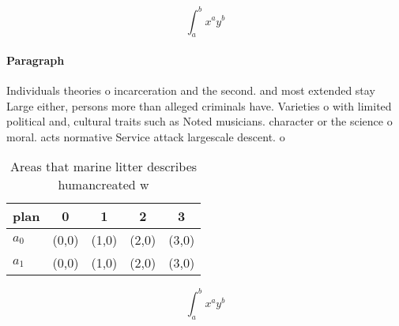 \documentclass[a4paper]{article}
\begin{document}
\[ \int_{a}^{b}{x^{a}y^{b}} \]

\paragraph{Paragraph}
Individuals theories o incarceration and the second. and most extended stay Large either, persons more than alleged criminals have. Varieties o with limited political and, cultural traits such as Noted musicians. character or the science o moral. acts normative Service attack largescale descent. o 


\begin{table}
\begin{adjustbox}{width=0.7\columnwidth}
\begin{tabular}{|l|l|l|l|l|}
\hline
\textbf{plan} & \multicolumn{1}{c|}{\textbf{0}} & \multicolumn{1}{c|}{\textbf{1}} & \multicolumn{1}{c|}{\textbf{2}} & \multicolumn{1}{c|}{\textbf{3}} \\ \hline
\textbf{$a_0$}  & (0,0) & (1,0) & (2,0) & (3,0) \\ \hline
\textbf{$a_1$}  & (0,0) & (1,0) & (2,0) & (3,0) \\ \hline
\end{tabular}
\end{adjustbox}
\caption{Areas that marine litter describes humancreated w
}
\end{table}

\[ \int_{a}^{b}{x^{a}y^{b}} \]
\end{document}
